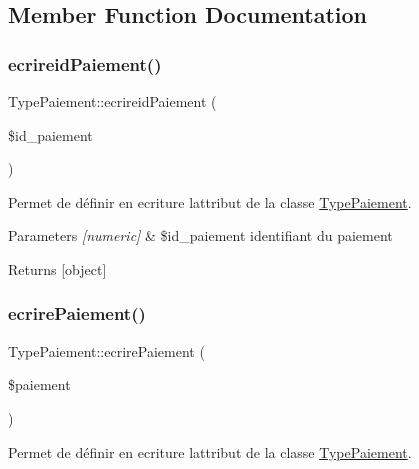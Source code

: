 \subsection{Member Function Documentation}
\mbox{\label{class_type_paiement_a1567c4c03fa1307f74a4171648bc92c5}} 
\subsubsection{\texorpdfstring{ecrireid\+Paiement()}{ecrireidPaiement()}}
{\footnotesize\ttfamily Type\+Paiement\+::ecrireid\+Paiement (\begin{DoxyParamCaption}\item[{}]{\$id\+\_\+paiement }\end{DoxyParamCaption})}



Permet de définir en ecriture l\textquotesingle{}attribut de la classe \hyperlink{class_type_paiement}{Type\+Paiement}. 


\begin{DoxyParams}{Parameters}
{\em \mbox{[}numeric\mbox{]}} & \$id\+\_\+paiement identifiant du paiement \\
\hline
\end{DoxyParams}
\begin{DoxyReturn}{Returns}
\mbox{[}object\mbox{]} 
\end{DoxyReturn}
\mbox{\label{class_type_paiement_ac8d925dbf3baccabd219ce3f9ad1d1e3}} 
\subsubsection{\texorpdfstring{ecrire\+Paiement()}{ecrirePaiement()}}
{\footnotesize\ttfamily Type\+Paiement\+::ecrire\+Paiement (\begin{DoxyParamCaption}\item[{}]{\$paiement }\end{DoxyParamCaption})}



Permet de définir en ecriture l\textquotesingle{}attribut de la classe \hyperlink{class_type_paiement}{Type\+Paiement}. 


